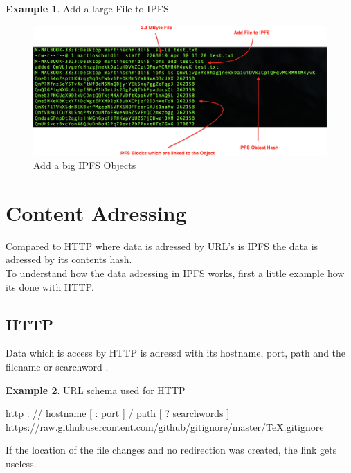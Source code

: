\documentclass[a4paper,11pt, oneside]{report}
\theoremstyle{definition}
\newtheorem{exmp}{Example}[subsection]
\begin{document}
\begin{exmp}Add a large File to IPFS \\
\begin{figure}[H]
\centering
\includegraphics[width=\textwidth]{img/ipfs-object-example.png}
\caption[IPFS Objects Example]{Add a big IPFS Objects}
\end{figure}
\end{exmp}

\newpage

\section{Content Adressing}
Compared to HTTP where data is adressed by URL's is IPFS the data is adressed by its contents hash.\\
To understand how the data adressing in IPFS works, first a little example how its done with HTTP.
\subsection{HTTP}
Data which is access by HTTP is adressd with its hostname, port, path and the filename or searchword \cite{HTTPAdressing}.
\begin{exmp} URL schema used for HTTP
\noindent
\begin{center}
http : // hostname [ : port ] / path [ ? searchwords ]\\
https://raw.githubusercontent.com/github/gitignore/master/TeX.gitignore
\end{center}
\end{exmp}
\noindent
If the location of the file changes and no redirection was created, the link gets useless.
\noindent
\end{document}
